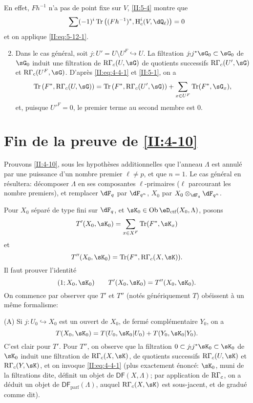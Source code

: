 En effet, $F h^{-1}$ n'a pas de point fixe sur $V$, \ref{II:5-4} montre que 
\[
	\sum (-1)^i \tr\left((F h^{-1})^*,\h_c^i(V,\dQ_\ell)\right)=0
\]
et on applique \eqref{II:eq:5-12-1}.
\begin{enumerate}[\indent A.]
\setcounter{enumi}{1}
  \item Dans le cas général, soit $j:U'=U\setminus U^F\hookrightarrow U$. 
    La filtration  $j_! j^* \sG_0\subset \sG_0$ de $\sG_0$ induit une 
    filtration de $\eR\Gamma_c(U,\sG)$ de quotients successifs 
    $\eR\Gamma_c(U',\sG)$ et $\eR\Gamma_c(U^F,\sG)$. D'après \eqref{II:eq:4-4-1} 
    et \ref{II:5-1}, on a 
    \[
      \tr\left(F^*,\eR\Gamma_c(U,\sG)\right) = \tr\left(F^*,\eR\Gamma_c(U',\sG)\right) + \sum_{x\in U^F} \tr(F^*,\sG_x) \text{,}
    \]
    et, puisque ${U'}^F=0$, le premier terme au second membre est $0$. 
\end{enumerate}










\section{Fin de la preuve de \ref{II:4-10}}\label{II:6}

Prouvons \ref{II:4-10}, sous les hypothèses additionnelles que l'anneau 
$\Lambda$ est annulé par une puissance d'un nombre premier $\ell\ne p$, et 
que $n=1$. Le cas général en résultera: décomposer $\Lambda$ en ses 
composantes $\ell$-primaires ($\ell$ parcourant les nombre premiers), et 
remplacer $\dF_q$ par $\dF_{q^n}$, $X_0$ par $X_0\otimes_{\dF_q}\dF_{q^n}$. 

Pour $X_0$ séparé de type fini sur $\dF_q$, et 
$\sK_0\in\ob\eD_\text{ctf}(X_0,\Lambda)$, posons 
\[
  T'(X_0,\sK_0) = \sum_{x\in X^F} \tr(F^*,\sK_x)
\]
et
\[
  T''(X_0,\sK_0) = \tr(F^*,\eR\Gamma_c(X,\sK)) \text{.}
\]
Il faut prouver l'identité 
\[
  (1;X_0,\sK_0) \qquad T'(X_0,\sK_0) = T''(X_0,\sK_0) \text{.}
\]
On commence par observer que $T'$ et $T''$ (notés génériquement $T$) 
obéissent à un même formalisme:

(A) Si $j:U_0\hookrightarrow X_0$ est un ouvert de $X_0$, de fermé 
complémentaire $Y_0$, on a 
\[
  T(X_0,\sK_0) = T(U_0,\sK_0|U_0) + T(Y_0,\sK_0|Y_0) \text{.}
\]
C'est clair pour $T'$. Pour $T''$, on observe que la filtration 
$0\subset j_! j^* \sK_0\subset \sK_0$ de $\sK_0$ induit une filtration de 
$\eR\Gamma_c(X,\sK)$, de quotients successifs $\eR\Gamma_c(U,\sK)$ et 
$\eR\Gamma_c(Y,\sK)$, et on invoque \eqref{II:eq:4-4-1} (plus exactement 
énoncé: $\sK_0$, muni de la filtrations dite, définit un objet de 
$\mathsf{DF}(X,\Lambda)$; par application de $\mathrm{R}\Gamma_c$, on a déduit un 
objet de $\mathsf{DF}_\text{parf}(\Lambda)$, auquel $\eR\Gamma_c(X,\sK)$ est 
sous-jacent, et de gradué comme dit). 

